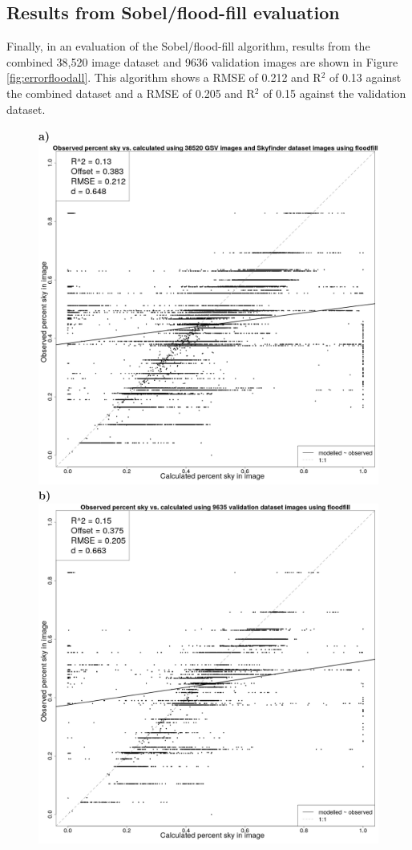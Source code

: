 \documentclass[final,3p,times,authoryear]{elsarticle}
\begin{document}
\subsection{Results from Sobel/flood-fill evaluation}\label{sec:resultsflood}
Finally, in an evaluation of the Sobel/flood-fill algorithm, results from the combined 38,520 image dataset and 9636 validation images are shown in Figure \ref{fig:errorfloodall}. This algorithm shows a RMSE of 0.212 and R$^{2}$ of 0.13 against the combined dataset and a RMSE of 0.205 and R$^{2}$ of 0.15 against the validation dataset.


\begin{figure}
\centering
\textbf{a)}\includegraphics[scale=0.15]{Images/ErrorPlots2FloodfillAll.png}
\textbf{b)}\includegraphics[scale=0.15]{Images/ErrorPlots2FloodfillValidation.png}

\end{figure}
\end{document}
